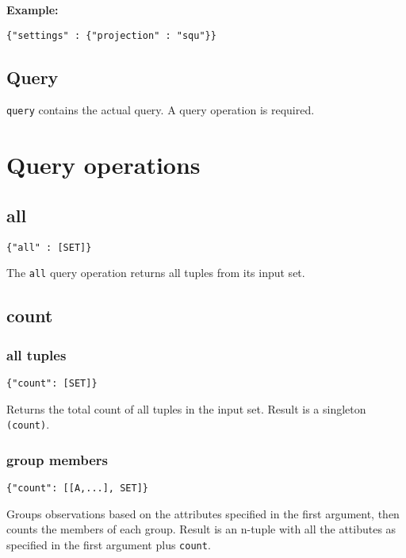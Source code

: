 \documentclass[12pt]{article}
\begin{document}
\textbf{Example:}
\begin{verbatim}
{"settings" : {"projection" : "squ"}}
\end{verbatim}

\subsection{Query}

\verb|query| contains the actual query. A query operation is required. 

\section{Query operations}

\subsection{all}

\begin{verbatim}
{"all" : [SET]}
\end{verbatim}

The \verb|all| query operation returns all tuples from its input set.

\subsection{count}

\subsubsection{all tuples}

\begin{verbatim}
{"count": [SET]}
\end{verbatim}

Returns the total count of all tuples in the input set. Result is a singleton \verb|(count)|.

\subsubsection{group members}

\begin{verbatim}
{"count": [[A,...], SET]}
\end{verbatim}

Groups observations based on the attributes specified in the first argument, then counts the members of each group. 
Result is an n-tuple with all the attibutes as specified in the first argument plus \verb|count|. 
\end{document}
